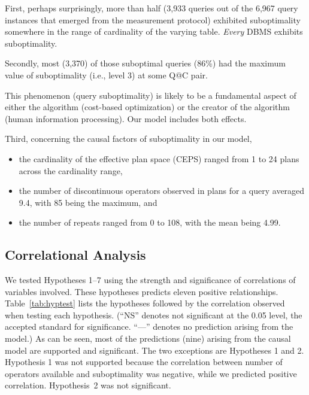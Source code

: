 \documentclass[prodmode,acmtods]{acmsmall}
\begin{document}
First, perhaps surprisingly, 
more than half (3,933 queries out of the 6,967
query instances that emerged from the measurement protocol) exhibited suboptimality
somewhere in the range of cardinality of the varying table. 
{\em Every} \hbox{DBMS} exhibits suboptimality.

Secondly, most (3,370) of those suboptimal queries (86\%) had the maximum value of
suboptimality  (i.e., level 3) at some Q@C pair.

This phenomenon (query suboptimality) is likely to be a fundamental aspect
of either the algorithm (cost-based optimization) or the creator of the
algorithm (human information processing). Our model includes both effects.

Third, concerning the causal factors of suboptimality in our model,
\begin{itemize}
\item the cardinality of the effective plan space (CEPS) ranged from 1 to 24
plans across the cardinality range,
\item the number of discontinuous operators observed in plans for a query
averaged 9.4, with 85 being the maximum, and
\item the number of repeats ranged from 0 to 108, with the mean being 4.99.
\end{itemize}
 
\subsection{Correlational Analysis}\label{sec:corr}
We tested Hypotheses 1--7 using the strength and significance of correlations
of variables involved. These hypotheses 
predicts eleven positive relationships. Table~\ref{tab:hyptest} lists the hypotheses followed by the
correlation observed when testing each hypothesis.  (``NS'' denotes not
significant at the 0.05 level, the accepted standard for
significance. ``---'' denotes no prediction arising from the model.)
As can
be seen, most of the predictions (nine) arising from the causal model are
supported and significant.  The two
exceptions are Hypotheses 1 and 2. Hypothesis 1 was not supported because
the correlation between number of operators available and suboptimality was negative,
while we predicted positive correlation.  \hbox{Hypothesis}~2 was not significant.
\end{document}
